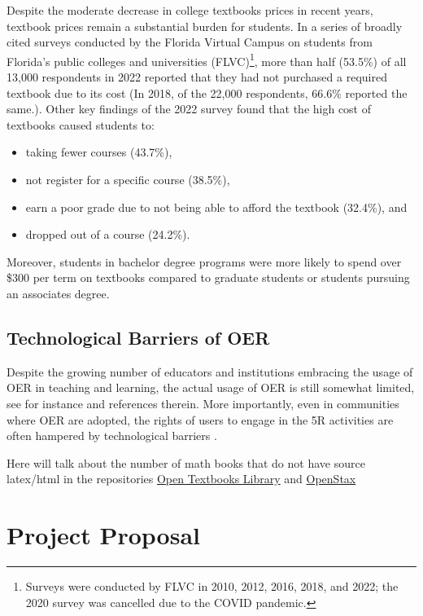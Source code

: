 \documentclass[11pt]{article}
\begin{document}
Despite the moderate decrease in college textbooks prices in recent years, textbook prices remain a substantial burden for students.  In a series of broadly cited surveys conducted by the Florida Virtual Campus on students from Florida's public colleges and universities (FLVC)\footnote{Surveys were conducted by FLVC in 2010, 2012, 2016, 2018, and 2022; the 2020 survey was cancelled due to the COVID pandemic.}, more than half (53.5\%) of all 13,000 respondents in 2022 reported that they had not purchased a required textbook due to its cost \cite{flvc2022} (In 2018, of the 22,000 respondents, 66.6\% reported the same.).  Other key findings of the 2022 survey found that the high cost of textbooks caused students to:
\begin{itemize}
\item taking fewer courses (43.7\%),
\item not register for a specific course (38.5\%),
\item earn a poor grade due to not being able to afford the textbook (32.4\%), and
\item dropped out of a course (24.2\%).
\end{itemize}
Moreover, students in bachelor degree programs were more likely to spend over \$300 per term on textbooks compared to graduate students or students pursuing an associates degree.

\subsection{Technological Barriers of OER}
Despite the growing number of educators and institutions embracing the usage of OER in teaching and learning, the actual usage of OER is still somewhat limited, see for instance \cite{MB:2022} and references therein.  More importantly, even in communities where OER are adopted, the rights of users to engage in the 5R activities are often hampered by technological barriers \cite{SO:19}.

Here will talk about the number of math books that do not have source latex/html in the repositories \href{https://open.umn.edu/opentextbooks}{Open Textbooks Library} and \href{https://openstax.org/}{OpenStax} 

\section{Project Proposal}
\end{document}
